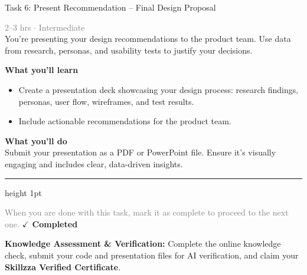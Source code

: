 \documentclass[10pt,a4paper]{article}
\begin{document}
\begin{taskbox}{Task 6: Present Recommendation – Final Design Proposal}

    {\small \textcolor{gray}{2--3 hrs $\cdot$ Intermediate}}\\[12pt]

      
You’re presenting your design recommendations to the product team. Use data from research, personas, and usability tests to justify your decisions.


\vspace{8pt}
{\large \textbf{\textcolor{brandLight}{What you'll learn}}}\\[4pt]  
\begin{itemize}
    \item Create a presentation deck showcasing your design process: research findings, personas, user flow, wireframes, and test results.  
    \item Include actionable recommendations for the product team.
\end{itemize}

\vspace{8pt}
{\large \textbf{\textcolor{brandLight}{What you'll do}}}\\[4pt]  
Submit your presentation as a PDF or PowerPoint file. Ensure it’s visually engaging and includes clear, data-driven insights.\par

    \vspace{16pt}

    \textcolor{cardBorder}{\hrule height 1pt}\vspace{8pt}

    \small \textcolor{gray}{When you are done with this task, mark it as complete to proceed to the next one.} \hfill \textbf{\textcolor{brandDark}{$\checkmark$ Completed}}

\end{taskbox}

\begin{completionbox}
    \textbf{Knowledge Assessment \& Verification:} Complete the online knowledge check, submit your code and presentation files for AI verification, and claim your \textbf{Skillzza Verified Certificate}.
\end{completionbox}

\newpage


\end{document}
